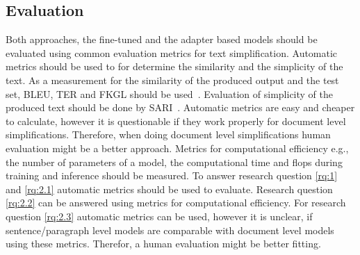 \subsection{Evaluation}
Both approaches, the fine-tuned and the adapter based models should be evaluated
using common evaluation metrics for text simplification.
Automatic metrics should be used to for determine the similarity and the simplicity of the text.
As a measurement for the similarity of the produced output and the test set, BLEU, TER and FKGL should be used~\cite{AlvaManchego2020}.
Evaluation of simplicity of the produced text should be done by SARI~\cite{AlvaManchego2020}.
Automatic metrics are easy and cheaper to calculate, however it is questionable if they work properly for document level
simplifications. Therefore, when doing document level simplifications human evaluation might be a better approach.
Metrics for computational efficiency e.g., the number of parameters of a model, the computational time and flops during
training and inference should be measured.
To answer research question \ref{rq:1} and \ref{rq:2.1} automatic metrics should be used to evaluate. Research question \ref{rq:2.2} can be answered
using metrics for computational efficiency. For research question \ref{rq:2.3} automatic metrics can be used, however it is unclear, if 
sentence/paragraph level models are comparable with document level models using these metrics. Therefor, a human evaluation might be better fitting.
